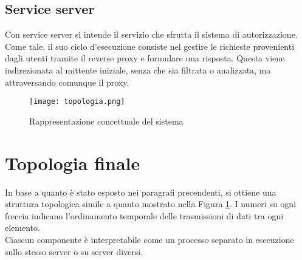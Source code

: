 \subsection{Service server}
Con service server si intende il servizio che sfrutta il sistema di autorizzazione. Come tale, il suo ciclo d'esecuzione consiste nel gestire 
le richieste provenienti dagli utenti tramite
 il reverse proxy e formulare una risposta.
Questa viene indirezionata al mittente iniziale, senza che sia filtrata o analizzata, ma attraversando comunque il proxy.

\begin{figure}[h]
    \texttt{[image: topologia.png]}
    \centering
    \caption{Rappresentazione concettuale del sistema}
    \label{topologia}
\end{figure}

\section{Topologia finale}
In base a quanto è stato esposto nei paragrafi precendenti, si ottiene una struttura topologica simile a quanto mostrato nella Figura \ref{topologia}. 
I numeri su ogni freccia indicano l'ordinamento temporale delle trasmissioni di dati tra ogni elemento. 
\\Ciascun componente è interpretabile come un processo separato in esecuzione sullo stesso server o su server diversi. 

